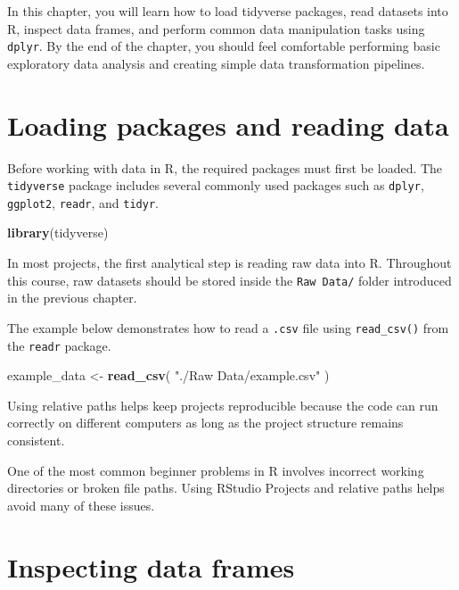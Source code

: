 \documentclass[
  11pt,
  oneside]{book}
\newenvironment{Shaded}{\begin{snugshade}}{\end{snugshade}}
\newcommand{\FunctionTok}[1]{\textcolor[rgb]{0.13,0.29,0.53}{\textbf{#1}}}
\newcommand{\NormalTok}[1]{#1}
\newcommand{\OtherTok}[1]{\textcolor[rgb]{0.56,0.35,0.01}{#1}}
\newcommand{\StringTok}[1]{\textcolor[rgb]{0.31,0.60,0.02}{#1}}
\begin{document}
In this chapter, you will learn how to load tidyverse packages, read datasets into R, inspect data frames, and perform common data manipulation tasks using \texttt{dplyr}. By the end of the chapter, you should feel comfortable performing basic exploratory data analysis and creating simple data transformation pipelines.

\section{Loading packages and reading data}\label{loading-packages-and-reading-data}

Before working with data in R, the required packages must first be loaded. The \texttt{tidyverse} package includes several commonly used packages such as \texttt{dplyr}, \texttt{ggplot2}, \texttt{readr}, and \texttt{tidyr}.

\begin{Shaded}
\begin{Highlighting}[]
\FunctionTok{library}\NormalTok{(tidyverse)}
\end{Highlighting}
\end{Shaded}

In most projects, the first analytical step is reading raw data into R. Throughout this course, raw datasets should be stored inside the \texttt{Raw\ Data/} folder introduced in the previous chapter.

The example below demonstrates how to read a \texttt{.csv} file using \texttt{read\_csv()} from the \texttt{readr} package.

\begin{Shaded}
\begin{Highlighting}[]
\NormalTok{example\_data }\OtherTok{\textless{}{-}} \FunctionTok{read\_csv}\NormalTok{(}
  \StringTok{"./Raw Data/example.csv"}
\NormalTok{)}
\end{Highlighting}
\end{Shaded}

Using relative paths helps keep projects reproducible because the code can run correctly on different computers as long as the project structure remains consistent.

One of the most common beginner problems in R involves incorrect working directories or broken file paths. Using RStudio Projects and relative paths helps avoid many of these issues.

\section{Inspecting data frames}\label{inspecting-data-frames}
\end{document}
